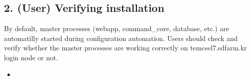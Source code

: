 \documentclass[a4paper,11pt,english]{sphinxmanual}
\begin{document}
\subsection{2. (User) Verifying installation}
\label{\detokenize{cryoSPARC:user-verifying-installation}}
\sphinxAtStartPar
By default, master processes (webapp, command\_core, database, etc.) are automatilly started during configuration automation.
Users should check and verify whether the master processes are working correctly on tem\sphinxhyphen{}cs\sphinxhyphen{}el7.sdfarm.kr login node or not.
\begin{itemize}
\item {} 
\sphinxAtStartPar
{}

\end{itemize}
\end{document}
